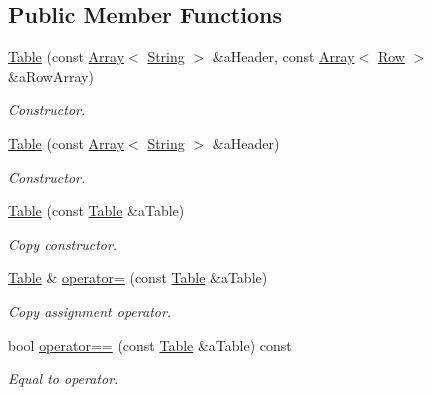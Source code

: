 \subsection*{Public Member Functions}
\begin{DoxyCompactItemize}
\item 
\hyperlink{classostk_1_1core_1_1ctnr_1_1_table_a1b799fa804faf23f9dd4905df90a5cd7}{Table} (const \hyperlink{classostk_1_1core_1_1ctnr_1_1_array}{Array}$<$ \hyperlink{classostk_1_1core_1_1types_1_1_string}{String} $>$ \&a\+Header, const \hyperlink{classostk_1_1core_1_1ctnr_1_1_array}{Array}$<$ \hyperlink{classostk_1_1core_1_1ctnr_1_1table_1_1_row}{Row} $>$ \&a\+Row\+Array)
\begin{DoxyCompactList}\small\item\em Constructor. \end{DoxyCompactList}\item 
\hyperlink{classostk_1_1core_1_1ctnr_1_1_table_a165db4eb20ff95886daded2766b090ad}{Table} (const \hyperlink{classostk_1_1core_1_1ctnr_1_1_array}{Array}$<$ \hyperlink{classostk_1_1core_1_1types_1_1_string}{String} $>$ \&a\+Header)
\begin{DoxyCompactList}\small\item\em Constructor. \end{DoxyCompactList}\item 
\hyperlink{classostk_1_1core_1_1ctnr_1_1_table_a94c2705ce991b21927a86bce4f3d6dce}{Table} (const \hyperlink{classostk_1_1core_1_1ctnr_1_1_table}{Table} \&a\+Table)
\begin{DoxyCompactList}\small\item\em Copy constructor. \end{DoxyCompactList}\item 
\hyperlink{classostk_1_1core_1_1ctnr_1_1_table}{Table} \& \hyperlink{classostk_1_1core_1_1ctnr_1_1_table_a5b1517b597097ffc09293208191f4a3b}{operator=} (const \hyperlink{classostk_1_1core_1_1ctnr_1_1_table}{Table} \&a\+Table)
\begin{DoxyCompactList}\small\item\em Copy assignment operator. \end{DoxyCompactList}\item 
bool \hyperlink{classostk_1_1core_1_1ctnr_1_1_table_afc0baa8593eaa0c3720c098e7bfdfe3a}{operator==} (const \hyperlink{classostk_1_1core_1_1ctnr_1_1_table}{Table} \&a\+Table) const
\begin{DoxyCompactList}\small\item\em Equal to operator. \end{DoxyCompactList}\item 

\end{DoxyCompactItemize}
